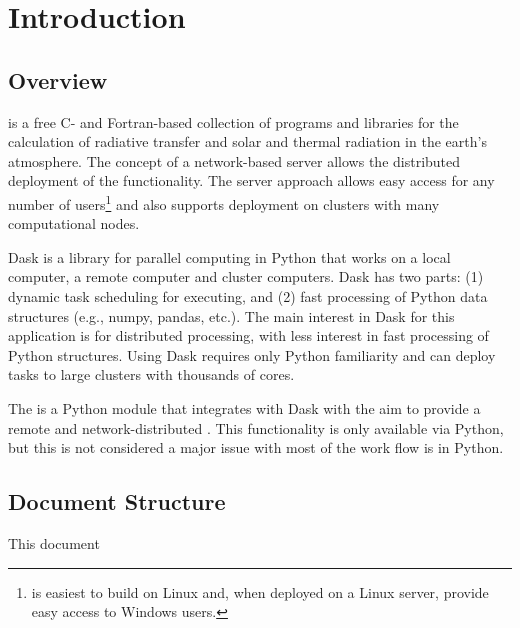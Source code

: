 
\chapter{Introduction}
\label{chap:Introduction}

\section{Overview}
\label{sec:introductionOverview}

\libradtran{} \cite{EmdeLibRadtran2016,libRadtran2005} is a free C- and Fortran-based collection of programs and libraries for the calculation of radiative transfer and solar and thermal radiation in the earth's atmosphere.
The concept of a network-based \libradtran{} server allows the  distributed deployment of the \libradtran{} functionality. The server approach allows easy access for any number of users\footnote{\libradtran{} is easiest to build on Linux and, when deployed on a Linux server, provide easy access to Windows users.} and also supports deployment on clusters with many computational nodes.

Dask \cite{daskhomepage2020} is a library for parallel computing in Python that works on a local computer, a remote computer and cluster computers.
Dask has two parts: (1) dynamic task scheduling for executing, and (2) fast processing of Python data structures (e.g., numpy, pandas, etc.).  The main interest in Dask for this application is for distributed  processing, with less interest in fast processing of Python structures. Using Dask requires only Python familiarity and can deploy tasks to large clusters with thousands of cores.

The \libradtrandask{}  is a Python module that integrates \libradtran{} with Dask with the aim to provide a remote and network-distributed \libradtran{}. This functionality is only available via Python, but this is not considered a major issue with most of the work flow is in Python.

\section{Document Structure}
\label{sec:DocumentStructure}


This   document
